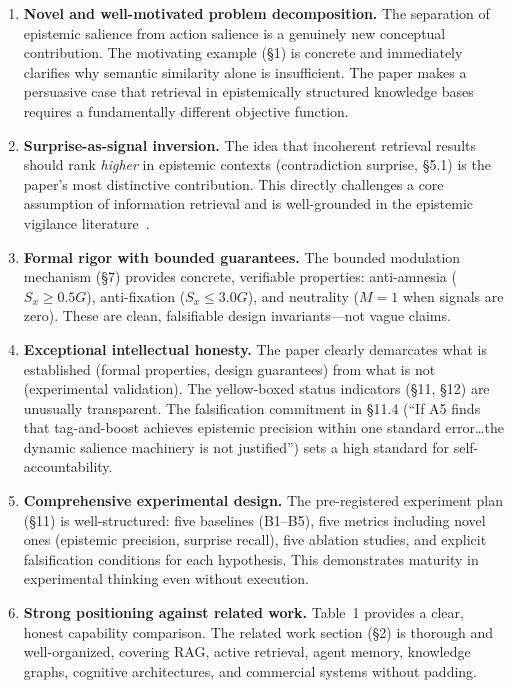 \documentclass[11pt,a4paper]{article}
\begin{document}
\begin{enumerate}[label=\textbf{S\arabic*.}, leftmargin=2em]

\item \textbf{Novel and well-motivated problem decomposition.} The separation of epistemic salience from action salience is a genuinely new conceptual contribution. The motivating example (\S1) is concrete and immediately clarifies why semantic similarity alone is insufficient. The paper makes a persuasive case that retrieval in epistemically structured knowledge bases requires a fundamentally different objective function.

\item \textbf{Surprise-as-signal inversion.} The idea that incoherent retrieval results should rank \emph{higher} in epistemic contexts (contradiction surprise, \S5.1) is the paper's most distinctive contribution. This directly challenges a core assumption of information retrieval and is well-grounded in the epistemic vigilance literature~\cite{sperber2010epistemic}.

\item \textbf{Formal rigor with bounded guarantees.} The bounded modulation mechanism (\S7) provides concrete, verifiable properties: anti-amnesia ($S_x \geq 0.5G$), anti-fixation ($S_x \leq 3.0G$), and neutrality ($M=1$ when signals are zero). These are clean, falsifiable design invariants---not vague claims.

\item \textbf{Exceptional intellectual honesty.} The paper clearly demarcates what is established (formal properties, design guarantees) from what is not (experimental validation). The yellow-boxed status indicators (\S11, \S12) are unusually transparent. The falsification commitment in \S11.4 (``If A5 finds that tag-and-boost achieves epistemic precision within one standard error\ldots the dynamic salience machinery is not justified'') sets a high standard for self-accountability.

\item \textbf{Comprehensive experimental design.} The pre-registered experiment plan (\S11) is well-structured: five baselines (B1--B5), five metrics including novel ones (epistemic precision, surprise recall), five ablation studies, and explicit falsification conditions for each hypothesis. This demonstrates maturity in experimental thinking even without execution.

\item \textbf{Strong positioning against related work.} Table~1 provides a clear, honest capability comparison. The related work section (\S2) is thorough and well-organized, covering RAG, active retrieval, agent memory, knowledge graphs, cognitive architectures, and commercial systems without padding.

\end{enumerate}
\end{document}
